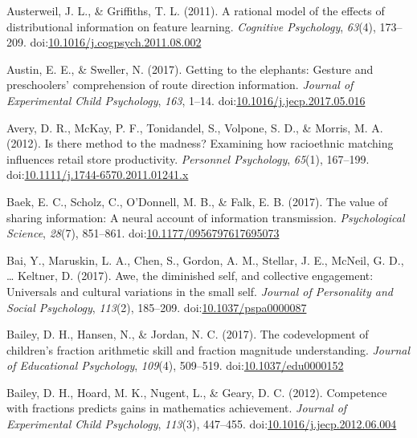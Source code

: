 \documentclass[english,man]{apa6}
\begin{document}
\hypertarget{ref-Austerweil2011}{}
Austerweil, J. L., \& Griffiths, T. L. (2011). A rational model of the
effects of distributional information on feature learning.
\emph{Cognitive Psychology}, \emph{63}(4), 173--209.
doi:\href{https://doi.org/10.1016/j.cogpsych.2011.08.002}{10.1016/j.cogpsych.2011.08.002}

\hypertarget{ref-Austin2017}{}
Austin, E. E., \& Sweller, N. (2017). Getting to the elephants: Gesture
and preschoolers' comprehension of route direction information.
\emph{Journal of Experimental Child Psychology}, \emph{163}, 1--14.
doi:\href{https://doi.org/10.1016/j.jecp.2017.05.016}{10.1016/j.jecp.2017.05.016}

\hypertarget{ref-Avery2012}{}
Avery, D. R., McKay, P. F., Tonidandel, S., Volpone, S. D., \& Morris,
M. A. (2012). Is there method to the madness? Examining how racioethnic
matching influences retail store productivity. \emph{Personnel
Psychology}, \emph{65}(1), 167--199.
doi:\href{https://doi.org/10.1111/j.1744-6570.2011.01241.x}{10.1111/j.1744-6570.2011.01241.x}

\hypertarget{ref-Baek2017}{}
Baek, E. C., Scholz, C., O'Donnell, M. B., \& Falk, E. B. (2017). The
value of sharing information: A neural account of information
transmission. \emph{Psychological Science}, \emph{28}(7), 851--861.
doi:\href{https://doi.org/10.1177/0956797617695073}{10.1177/0956797617695073}

\hypertarget{ref-Bai2017}{}
Bai, Y., Maruskin, L. A., Chen, S., Gordon, A. M., Stellar, J. E.,
McNeil, G. D., \ldots{} Keltner, D. (2017). Awe, the diminished self,
and collective engagement: Universals and cultural variations in the
small self. \emph{Journal of Personality and Social Psychology},
\emph{113}(2), 185--209.
doi:\href{https://doi.org/10.1037/pspa0000087}{10.1037/pspa0000087}

\hypertarget{ref-Bailey2017}{}
Bailey, D. H., Hansen, N., \& Jordan, N. C. (2017). The codevelopment of
children's fraction arithmetic skill and fraction magnitude
understanding. \emph{Journal of Educational Psychology}, \emph{109}(4),
509--519.
doi:\href{https://doi.org/10.1037/edu0000152}{10.1037/edu0000152}

\hypertarget{ref-Bailey2012}{}
Bailey, D. H., Hoard, M. K., Nugent, L., \& Geary, D. C. (2012).
Competence with fractions predicts gains in mathematics achievement.
\emph{Journal of Experimental Child Psychology}, \emph{113}(3),
447--455.
doi:\href{https://doi.org/10.1016/j.jecp.2012.06.004}{10.1016/j.jecp.2012.06.004}
\end{document}
